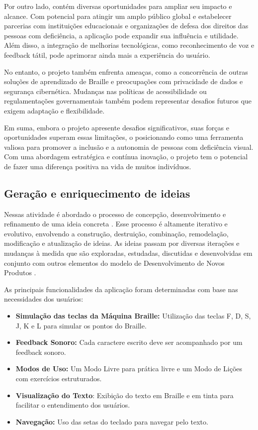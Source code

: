 Por outro lado, contém diversas oportunidades para ampliar seu impacto e alcance. Com potencial para atingir um amplo público global e estabelecer parcerias com instituições educacionais e organizações de defesa dos direitos das pessoas com deficiência, a aplicação pode expandir sua influência e utilidade. Além disso, a integração de melhorias tecnológicas, como reconhecimento de voz e feedback tátil, pode aprimorar ainda mais a experiência do usuário.

No entanto, o projeto também enfrenta ameaças, como a concorrência de outras soluções de aprendizado de Braille e preocupações com privacidade de dados e segurança cibernética. Mudanças nas políticas de acessibilidade ou regulamentações governamentais também podem representar desafios futuros que exigem adaptação e flexibilidade.

Em suma, embora o projeto apresente desafios significativos, suas forças e oportunidades superam essas limitações, o posicionando como uma ferramenta valiosa para promover a inclusão e a autonomia de pessoas com deficiência visual. Com uma abordagem estratégica e contínua inovação, o projeto tem o potencial de fazer uma diferença positiva na vida de muitos indivíduos.

\subsection{Geração e enriquecimento de ideias}

Nessas atividade é abordado o processo de concepção, desenvolvimento e refinamento de uma ideia concreta \parencite{BOOK01}. Esse processo é altamente iterativo e evolutivo, envolvendo a construção, destruição, combinação, remodelação, modificação e atualização de ideias. As ideias passam por diversas iterações e mudanças à medida que são exploradas, estudadas, discutidas e desenvolvidas em conjunto com outros elementos do modelo de Desenvolvimento de Novos Produtos \parencite{BOOK01}.

As principais funcionalidades da aplicação foram determinadas com base nas necessidades dos usuários:

\begin{itemize}
    \item \textbf{Simulação das teclas da Máquina Braille:} Utilização das teclas F, D, S, J, K e L para simular os pontos do Braille.
    \item \textbf{Feedback Sonoro:} Cada caractere escrito deve ser acompanhado por um feedback sonoro.
    \item \textbf{Modos de Uso:} Um Modo Livre para prática livre e um Modo de Lições com exercícios estruturados.
    \item \textbf{Visualização do Texto}: Exibição do texto em Braille e em tinta para facilitar o entendimento dos usuários.
    \item \textbf{Navegação:} Uso das setas do teclado para navegar pelo texto.
\end{itemize}

